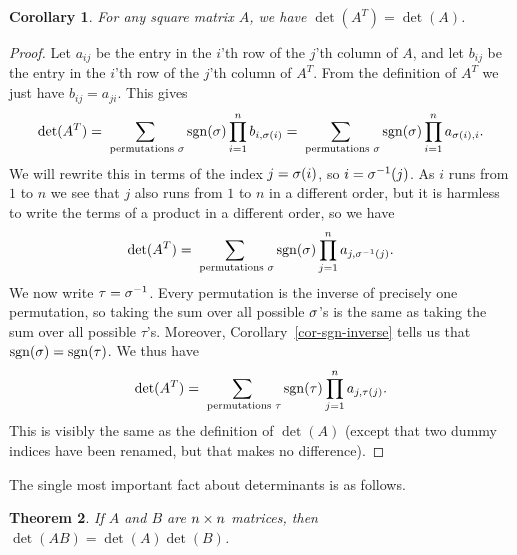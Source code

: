 \documentclass[reqno]{amsart}
\newtheorem{theorem}{Theorem}[section]
\newtheorem{corollary}[theorem]{Corollary}
\theoremstyle{definition}
\begin{document}
\begin{corollary}\label{cor-sgn-transpose}
 For any square matrix $A$, we have $\det(A^T)=\det(A)$.
\end{corollary}
\begin{proof}
 Let $a_{ij}$ be the entry in the $i$'th row of the $j$'th column of
 $A$, and let $b_{ij}$ be the entry in the $i$'th row of the $j$'th
 column of $A^T$.  From the definition of $A^T$ we just have
 $b_{ij}=a_{ji}$.  This gives
 \[ \det(A^T) =
     \sum_{\text{ permutations } \sigma}
      \operatorname{sgn}(\sigma) \prod_{i=1}^n b_{i,\sigma(i)}
      =
     \sum_{\text{ permutations } \sigma}
      \operatorname{sgn}(\sigma) \prod_{i=1}^n a_{\sigma(i),i}.
 \]
 We will rewrite this in terms of the index $j=\sigma(i)$, so
 $i=\sigma^{-1}(j)$.  As $i$ runs from $1$ to $n$ we see that $j$ also
 runs from $1$ to $n$ in a different order, but it is harmless to
 write the terms of a product in a different order, so we have
 \[ \det(A^T) =
     \sum_{\text{ permutations } \sigma} \operatorname{sgn}(\sigma) \prod_{j=1}^n
     a_{j,\sigma^{-1}(j)}.
 \]
 We now write $\tau=\sigma^{-1}$.  Every permutation is the inverse of
 precisely one permutation, so taking the sum over all possible
 $\sigma$'s is the same as taking the sum over all possible $\tau$'s.
 Moreover, Corollary~\ref{cor-sgn-inverse} tells us that
 $\operatorname{sgn}(\sigma)=\operatorname{sgn}(\tau)$.  We thus have
 \[ \det(A^T) =
     \sum_{\text{ permutations } \tau}
      \operatorname{sgn}(\tau) \prod_{j=1}^n a_{j,\tau(j)}.
 \]
 This is visibly the same as the definition of $\det(A)$ (except that
 two dummy indices have been renamed, but that makes no difference).
\end{proof}

The single most important fact about determinants is as follows.

\begin{theorem}\label{thm-det-prod}
 If $A$ and $B$ are $n\times n$ matrices, then $\det(AB)=\det(A)\det(B)$.
\end{theorem}
\end{document}
